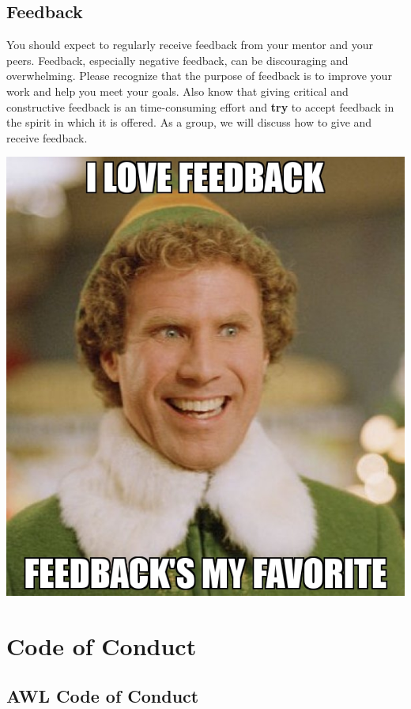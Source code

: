 \documentclass[
]{book}
\begin{document}
\hypertarget{feedback}{%
\section{Feedback}\label{feedback}}

You should expect to regularly receive feedback from your mentor and your peers. Feedback, especially negative feedback, can be discouraging and overwhelming. Please recognize that the purpose of feedback is to improve your work and help you meet your goals. Also know that giving critical and constructive feedback is an time-consuming effort and \textbf{try} to accept feedback in the spirit in which it is offered. As a group, we will discuss how to give and receive feedback.

\includegraphics{images/i-love-feedback.jpg}

\hypertarget{code-of-conduct}{%
\chapter{Code of Conduct}\label{code-of-conduct}}

\hypertarget{awl-code-of-conduct}{%
\section{AWL Code of Conduct}\label{awl-code-of-conduct}}
\end{document}
